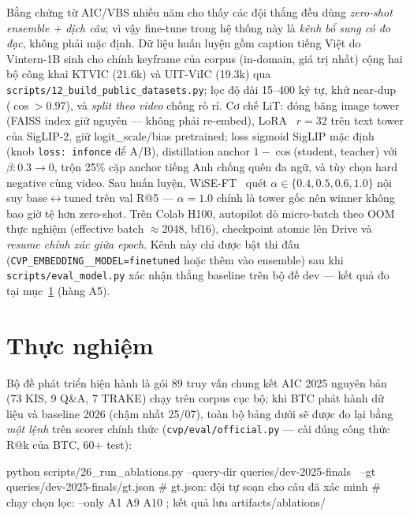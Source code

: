 \documentclass{ai_conquer2026}
\begin{document}
Bằng chứng từ AIC/VBS nhiều năm cho thấy các đội thắng đều dùng \emph{zero-shot ensemble +
dịch câu}; vì vậy fine-tune trong hệ thống này là \emph{kênh bổ sung có đo đạc}, không phải
mặc định. Dữ liệu huấn luyện gồm caption tiếng Việt do Vintern-1B sinh cho chính keyframe
của corpus (in-domain, giá trị nhất) cộng hai bộ công khai KTVIC (21.6k) và UIT-ViIC (19.3k)
qua \texttt{scripts/12\_build\_public\_datasets.py}; lọc độ dài 15--400 ký tự, khử near-dup
($\cos>0.97$), và \emph{split theo video} chống rò rỉ. Cơ chế LiT: đóng băng image tower
(FAISS index giữ nguyên --- không phải re-embed), LoRA~\cite{hu2022lora} $r{=}32$ trên text
tower của SigLIP-2, giữ logit\_scale/bias pretrained; loss sigmoid SigLIP mặc định
(knob \texttt{loss: infonce} để A/B), distillation anchor $1-\cos$(student, teacher) với
$\beta: 0.3\rightarrow0$, trộn 25\% cặp anchor tiếng Anh chống quên đa ngữ, và tùy chọn hard
negative cùng video. Sau huấn luyện, WiSE-FT~\cite{wortsman2022wiseft} quét
$\alpha\in\{0.4,0.5,0.6,1.0\}$ nội suy base$\leftrightarrow$tuned trên val R@5 ---
$\alpha{=}1.0$ chính là tower gốc nên winner không bao giờ tệ hơn zero-shot. Trên Colab
H100, autopilot dò micro-batch theo OOM thực nghiệm (effective batch $\approx$2048, bf16),
checkpoint atomic lên Drive và \emph{resume chính xác giữa epoch}. Kênh này chỉ được bật thi
đấu (\texttt{CVP\_EMBEDDING\_\_MODEL=finetuned} hoặc thêm vào ensemble) sau khi
\texttt{scripts/eval\_model.py} xác nhận thắng baseline trên bộ đề dev --- kết quả đo tại
mục~\ref{sec:exp} (hàng A5). %

\section{Thực nghiệm}\label{sec:exp}

Bộ đề phát triển hiện hành là gói 89 truy vấn chung kết AIC 2025 nguyên bản (73 KIS, 9 Q\&A,
7 TRAKE) chạy trên corpus cục bộ; khi BTC phát hành dữ liệu và baseline 2026 (chậm nhất
25/07), toàn bộ bảng dưới sẽ được đo lại bằng \emph{một lệnh} trên scorer chính thức
(\texttt{cvp/eval/official.py} --- cài đúng công thức R@k của BTC, 60+ test):

\begin{aivnoutputbox}
python scripts/26_run_ablations.py --query-dir queries/dev-2025-finals \
    --gt queries/dev-2025-finals/gt.json  # gt.json: đội tự soạn cho câu đã xác minh
# chạy chọn lọc: --only A1 A9 A10 ; kết quả lưu artifacts/ablations/
\end{aivnoutputbox}
\end{document}
